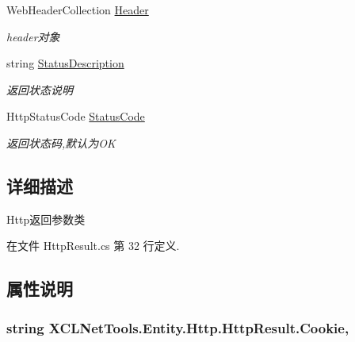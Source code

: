 \begin{DoxyCompactItemize}
Web\-Header\-Collection \hyperlink{class_x_c_l_net_tools_1_1_entity_1_1_http_1_1_http_result_af2f67a87b13cf52358900ff814f88f20}{Header}
\begin{DoxyCompactList}\small\item\em header对象 \end{DoxyCompactList}\item 
string \hyperlink{class_x_c_l_net_tools_1_1_entity_1_1_http_1_1_http_result_ae52de9f66b0248b366ee38cc9eae5659}{Status\-Description}
\begin{DoxyCompactList}\small\item\em 返回状态说明 \end{DoxyCompactList}\item 
Http\-Status\-Code \hyperlink{class_x_c_l_net_tools_1_1_entity_1_1_http_1_1_http_result_afa7d6f65074d0dc74bca65f6e7d79a79}{Status\-Code}
\begin{DoxyCompactList}\small\item\em 返回状态码,默认为\-O\-K \end{DoxyCompactList}\end{DoxyCompactItemize}


\subsection{详细描述}
Http返回参数类 



在文件 Http\-Result.\-cs 第 32 行定义.



\subsection{属性说明}
\hypertarget{class_x_c_l_net_tools_1_1_entity_1_1_http_1_1_http_result_a08219bb78cf5eb91045b344c91e72fad}{
\subsubsection[{Cookie}]{\setlength{\rightskip}{0pt plus 5cm}string X\-C\-L\-Net\-Tools.\-Entity.\-Http.\-Http\-Result.\-Cookie\hspace{0.3cm}{\ttfamily [get]}, {\ttfamily [set]}}}\label{class_x_c_l_net_tools_1_1_entity_1_1_http_1_1_http_result_a08219bb78cf5eb91045b344c91e72fad}


